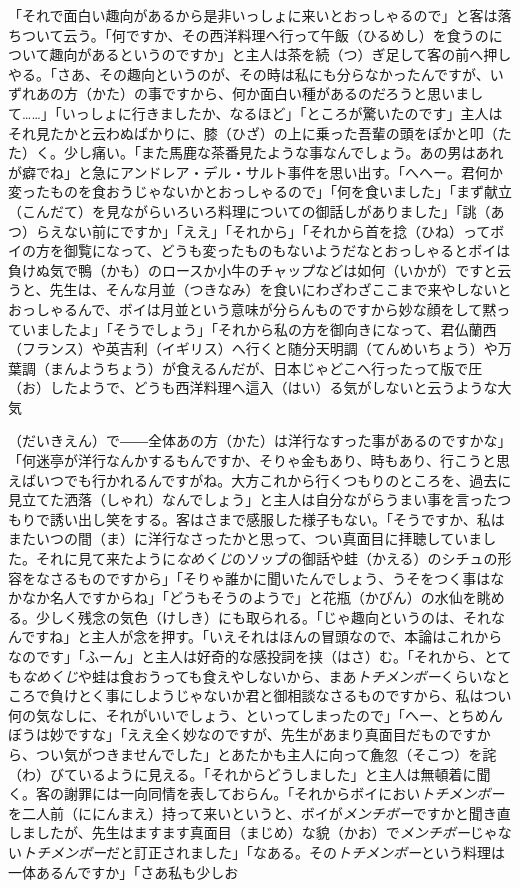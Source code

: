 \documentclass{book}
\begin{document}
「それで面白い趣向があるから是非いっしょに来いとおっしゃるので」と客は落ちついて云う。「何ですか、その西洋料理へ行って午飯（ひるめし）を食うのについて趣向があるというのですか」と主人は茶を続（つ）ぎ足して客の前へ押しやる。「さあ、その趣向というのが、その時は私にも分らなかったんですが、いずれあの方（かた）の事ですから、何か面白い種があるのだろうと思いまして\ldots{}\ldots{}」「いっしょに行きましたか、なるほど」「ところが驚いたのです」主人はそれ見たかと云わぬばかりに、膝（ひざ）の上に乗った吾輩の頭をぽかと叩（たた）く。少し痛い。「また馬鹿な茶番見たような事なんでしょう。あの男はあれが癖でね」と急にアンドレア・デル・サルト事件を思い出す。「へへー。君何か変ったものを食おうじゃないかとおっしゃるので」「何を食いました」「まず献立（こんだて）を見ながらいろいろ料理についての御話しがありました」「誂（あつ）らえない前にですか」「ええ」「それから」「それから首を捻（ひね）ってボイの方を御覧になって、どうも変ったものもないようだなとおっしゃるとボイは負けぬ気で鴨（かも）のロースか小牛のチャップなどは如何（いかが）ですと云うと、先生は、そんな月並（つきなみ）を食いにわざわざここまで来やしないとおっしゃるんで、ボイは月並という意味が分らんものですから妙な顔をして黙っていましたよ」「そうでしょう」「それから私の方を御向きになって、君仏蘭西（フランス）や英吉利（イギリス）へ行くと随分天明調（てんめいちょう）や万葉調（まんようちょう）が食えるんだが、日本じゃどこへ行ったって版で圧（お）したようで、どうも西洋料理へ這入（はい）る気がしないと云うような大気\begin{comment}\texttt{[image: ../../../gaiji/1-87/1-87-64.png]}\end{comment}（だいきえん）で――全体あの方（かた）は洋行なすった事があるのですかな」「何迷亭が洋行なんかするもんですか、そりゃ金もあり、時もあり、行こうと思えばいつでも行かれるんですがね。大方これから行くつもりのところを、過去に見立てた洒落（しゃれ）なんでしょう」と主人は自分ながらうまい事を言ったつもりで誘い出し笑をする。客はさまで感服した様子もない。「そうですか、私はまたいつの間（ま）に洋行なさったかと思って、つい真面目に拝聴していました。それに見て来たように\emph{なめくじ}のソップの御話や蛙（かえる）のシチュの形容をなさるものですから」「そりゃ誰かに聞いたんでしょう、うそをつく事はなかなか名人ですからね」「どうもそうのようで」と花瓶（かびん）の水仙を眺める。少しく残念の気色（けしき）にも取られる。「じゃ趣向というのは、それなんですね」と主人が念を押す。「いえそれはほんの冒頭なので、本論はこれからなのです」「ふーん」と主人は好奇的な感投詞を挟（はさ）む。「それから、とても\emph{なめくじ}や蛙は食おうっても食えやしないから、まあ\emph{トチメンボー}くらいなところで負けとく事にしようじゃないか君と御相談なさるものですから、私はつい何の気なしに、それがいいでしょう、といってしまったので」「へー、とちめんぼうは妙ですな」「ええ全く妙なのですが、先生があまり真面目だものですから、つい気がつきませんでした」とあたかも主人に向って麁忽（そこつ）を詫（わ）びているように見える。「それからどうしました」と主人は無頓着に聞く。客の謝罪には一向同情を表しておらん。「それからボイにおい\emph{トチメンボー}を二人前（ににんまえ）持って来いというと、ボイが\emph{メンチボー}ですかと聞き直しましたが、先生はますます真面目（まじめ）な貌（かお）で\emph{メンチボー}じゃない\emph{トチメンボー}だと訂正されました」「なある。その\emph{トチメンボー}という料理は一体あるんですか」「さあ私も少しお
\end{document}
